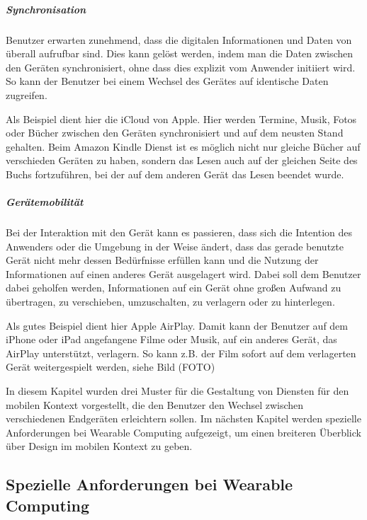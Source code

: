 \subparagraph{Synchronisation}

Benutzer erwarten zunehmend, dass die digitalen Informationen und Daten von überall aufrufbar sind. Dies kann gelöst werden, indem man die Daten zwischen den Geräten synchronisiert, ohne dass dies explizit vom Anwender initiiert wird. So kann der Benutzer bei einem Wechsel des Gerätes auf identische Daten zugreifen. 

Als Beispiel dient hier die iCloud von Apple. Hier werden Termine, Musik, Fotos oder Bücher zwischen den Geräten synchronisiert und auf dem neusten Stand gehalten. Beim Amazon Kindle Dienst ist es möglich nicht nur gleiche Bücher auf verschieden Geräten zu haben, sondern das Lesen auch auf der gleichen Seite des Buchs fortzuführen, bei der auf dem anderen Gerät das Lesen beendet wurde.

\subparagraph{Gerätemobilität}

Bei der Interaktion mit den Gerät kann es passieren, dass sich die Intention des Anwenders oder die Umgebung in der Weise ändert, dass das gerade benutzte Gerät nicht mehr dessen Bedürfnisse erfüllen kann und die Nutzung der Informationen auf einen anderes Gerät ausgelagert wird. Dabei soll dem Benutzer dabei geholfen werden, Informationen auf ein Gerät ohne großen Aufwand zu übertragen, zu verschieben, umzuschalten, zu verlagern oder zu hinterlegen.

Als gutes Beispiel dient hier Apple AirPlay. Damit kann der Benutzer auf dem iPhone oder iPad angefangene Filme oder Musik, auf ein anderes Gerät, das AirPlay unterstützt, verlagern. So kann z.B. der  Film sofort auf dem verlagerten Gerät weitergespielt werden, siehe Bild (FOTO)
\newline

In diesem Kapitel wurden drei Muster für die Gestaltung von Diensten für den mobilen Kontext vorgestellt, die den Benutzer den Wechsel zwischen verschiedenen  Endgeräten erleichtern sollen. Im nächsten Kapitel werden spezielle Anforderungen bei Wearable Computing aufgezeigt, um einen breiteren Überblick über Design im mobilen Kontext zu geben.

\subsection{Spezielle Anforderungen bei Wearable Computing} 
\label{sub:wearable_computers}


